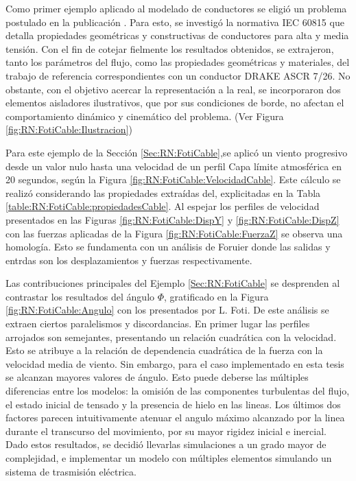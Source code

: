  Como primer ejemplo aplicado al modelado de conductores se eligió un problema postulado en la publicación \citep{Foti2016}. Para esto, se investigó la normativa IEC 60815 que detalla propiedades geométricas y constructivas de conductores para alta y media tensión.  Con el fin de cotejar fielmente los resultados obtenidos, se extrajeron, tanto los parámetros del flujo, como las propiedades geométricas y materiales, del trabajo de referencia correspondientes con un conductor DRAKE ASCR 7/26. No obstante, con el objetivo acercar la representación a la real, se incorporaron dos elementos aisladores ilustrativos, que por sus condiciones de borde, no afectan el comportamiento dinámico y cinemático del problema. (Ver Figura \ref{fig:RN:FotiCable:Ilustracion})
 
 Para este ejemplo de la Sección \ref{Sec:RN:FotiCable},se aplicó un viento progresivo desde un valor nulo hasta una velocidad de un perfil Capa límite atmosférica en 20 segundos, según la Figura \ref{fig:RN:FotiCable:VelocidadCable}. Este cálculo se realizó considerando las propiedades extraídas del\citep{euroCode}, explicitadas en la Tabla \ref{table:RN:FotiCable:propiedadesCable}. Al espejar los perfiles de velocidad presentados en las Figuras \ref{fig:RN:FotiCable:DispY} y \ref{fig:RN:FotiCable:DispZ} con las fuerzas aplicadas de la Figura \ref{fig:RN:FotiCable:FuerzaZ} se observa una homología. Esto se fundamenta con un análisis de Foruier donde las salidas y entrdas son los desplazamientos y fuerzas respectivamente. 
 
 Las contribuciones principales del Ejemplo \ref{Sec:RN:FotiCable} se desprenden al contrastar los resultados del ángulo $\Phi$, gratificado en la Figura \ref{fig:RN:FotiCable:Angulo} con los presentados por L. Foti. De este análisis se extraen ciertos paralelismos y discordancias. En primer lugar las perfiles arrojados son semejantes, presentando un relación cuadrática con la velocidad. Esto se atribuye a la relación de dependencia cuadrática de la fuerza con la velocidad media de viento. Sin embargo, para el caso implementado en esta tesis se alcanzan mayores valores de ángulo. Esto puede deberse las múltiples diferencias entre los modelos: la omisión de las componentes turbulentas del flujo, el estado inicial de tensado y la presencia de hielo en las lineas. Los últimos dos factores parecen intuitivamente atenuar el angulo máximo alcanzado por la linea durante el transcurso del movimiento, por su mayor rigidez inicial e inercial. Dado estos resultados, se decidió llevarlas simulaciones a un grado mayor de complejidad, e implementar un modelo con múltiples elementos simulando un sistema de trasmisión eléctrica.  
 
